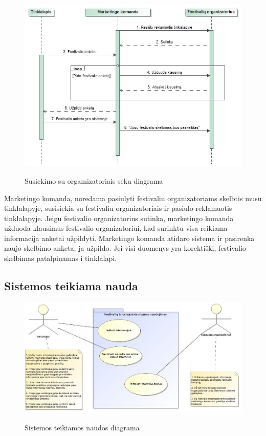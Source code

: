 ﻿\documentclass{VUMIFPSkursinis}
\begin{document}
\begin{figure}[H]
    \centering
    \includegraphics[scale=0.7]{img/geri/markIesko}
    \label{img:uml27}
	\caption{Susiekimo su orgamizatoriais seku diagrama}
\end{figure}

Marketingo komanda, noredama pasiulyti festivaliu organizatoriams skelbtis musu tinklalapyje, susisiekia su festivaliu organizatoriais ir pasiulo reklamuotis tinklalapyje. Jeigu festivalio organizatorius sutinka, marketingo komanda užduoda klausimus festivalio organizatoriui, kad surinktu visa reikiama informacija anketai užpildyti. Marketingo komanda atidaro sistema ir pasirenka naujo skelbimo anketa, ja užpildo. Jei visi duomenys yra korektiški, festivalio skelbimas patalpinamas i tinklalapi.

\subsection{Sistemos teikiama nauda}

\begin{figure}[H]
    \centering
    \includegraphics[scale=0.5]{img/geri/sisNauda}
    \label{img:uml28}
	\caption{Sistemos teikiamos naudos diagrama}
\end{figure}
\end{document}
